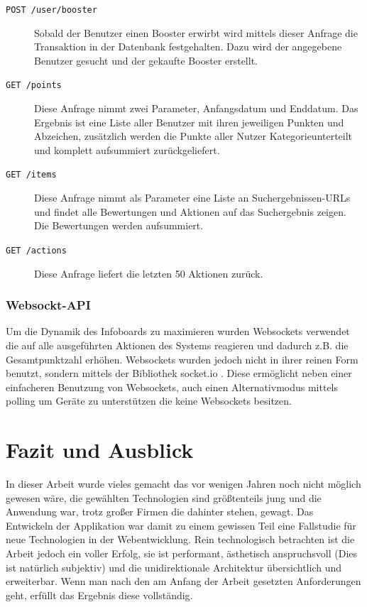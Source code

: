 \documentclass[12pt,twoside]{book}
\begin{document}
\begin{description}
	\item[\texttt{POST /user/booster}] Sobald der Benutzer einen Booster erwirbt wird mittels dieser Anfrage die Transaktion in der Datenbank festgehalten. Dazu wird der angegebene Benutzer gesucht und der gekaufte Booster erstellt.
	\item[\texttt{GET /points}] Diese Anfrage nimmt zwei Parameter, Anfangsdatum und Enddatum. Das Ergebnis ist eine Liste aller Benutzer mit ihren jeweiligen Punkten und Abzeichen, zusätzlich werden die Punkte aller Nutzer Kategorieunterteilt und komplett aufsummiert zurückgeliefert.
	\item[\texttt{GET /items}] Diese Anfrage nimmt als Parameter eine Liste an Suchergebnissen-URLs und findet alle Bewertungen und Aktionen auf das Suchergebnis zeigen. Die Bewertungen werden aufsummiert.
	\item[\texttt{GET /actions}] Diese Anfrage liefert die letzten 50 Aktionen zurück.

\end{description}

\subsection{Websockt-API}

Um die Dynamik des Infoboards zu maximieren wurden Websockets verwendet die auf alle ausgeführten Aktionen des Systems reagieren und dadurch z.B. die Gesamtpunktzahl erhöhen. Websockets wurden jedoch nicht in ihrer reinen Form benutzt, sondern mittels der Bibliothek socket.io \cite{rauch2013socket}. Diese ermöglicht neben einer einfacheren Benutzung von Websockets,
auch einen Alternativmodus mittels polling um Geräte zu unterstützen die keine Websockets besitzen.


\chapter{Fazit und Ausblick}

In dieser Arbeit wurde vieles gemacht das vor wenigen Jahren noch nicht möglich gewesen wäre, die gewählten Technologien sind größtenteils jung und die Anwendung war, trotz großer Firmen die dahinter stehen, gewagt. Das Entwickeln der Applikation war damit zu einem gewissen Teil eine Fallstudie für neue Technologien in der Webentwicklung.
Rein technologisch betrachten ist die Arbeit jedoch ein voller Erfolg, sie ist performant, ästhetisch anspruchsvoll (Dies ist natürlich subjektiv) und die unidirektionale Architektur übersichtlich und erweiterbar.
Wenn man nach den am Anfang der Arbeit gesetzten Anforderungen geht, erfüllt das Ergebnis diese vollständig.
\end{document}
